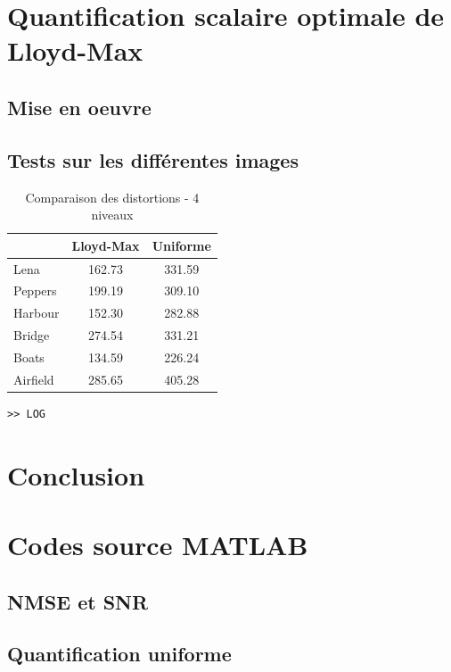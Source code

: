 \documentclass[a4paper, 12pt]{article}
\newcommand{\FSource}[1]{%

}
\begin{document}
\section{Quantification scalaire optimale de Lloyd-Max}

\subsection{Mise en oeuvre}



\subsection{Tests sur les différentes images}

\begin{table}[!h]
	\centering
		\begin{tabular}{l|c | c|}
			\cline{2-3}
			                               & Lloyd-Max & Uniforme \\
			\hline
			\multicolumn{1}{|l|}{Lena}     & 162.73    &  331.59  \\
			\hline
			\multicolumn{1}{|l|}{Peppers}  & 199.19    &  309.10  \\
			\hline
			\multicolumn{1}{|l|}{Harbour}  & 152.30    &  282.88  \\
			\hline
			\multicolumn{1}{|l|}{Bridge}   & 274.54    &  331.21  \\
			\hline
			\multicolumn{1}{|l|}{Boats}    & 134.59    &  226.24  \\
			\hline
			\multicolumn{1}{|l|}{Airfield} & 285.65    &  405.28  \\
			\hline
		\end{tabular}
	\caption{Comparaison des distortions - 4 niveaux}
	\label{tab:TableComparaisonDisto}
\end{table}

\begin{verbatim}
>> LOG
\end{verbatim} 

\newpage

\section{Conclusion}


\clearpage
\appendix

\section{Codes source MATLAB}
\subsection{NMSE et SNR}\label{nmse_snr_code}

\FSource{../disto_1_1.m}

\newpage

\subsection{Quantification uniforme}\label{quant_uni_code}

\FSource{../quant_uni_1_2.m}
\end{document}
